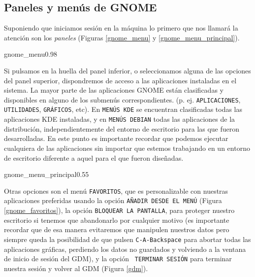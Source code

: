 \subsection{Paneles y menús de GNOME}

Suponiendo  que iniciamos  sesión en  la  máquina lo  primero que  nos
llamará la atención son los  {\em paneles} (Figuras \ref{gnome_menu} y
\ref{gnome_menu_principal}).  

\begin{figura}{gnome_menu}{0.98}
\caption{Menú de panel de {\sf GNOME}}\label{gnome_menu}
\end{figura}

Si  pulsamos  en  la  huella   del  panel  inferior,  o  seleccionamos
alguna  de las  opciones del  panel superior,  dispondremos de  acceso
a  las  aplicaciones instaladas  en  el  sistema.  La mayor  parte  de
las  aplicaciones  {\sf GNOME}  están  clasificadas  y disponibles  en
alguno de  los submenús correspondientes. (p.  ej. {\tt APLICACIONES},
{\tt  UTILIDADES},  {\tt  GRÁFICOS},  etc).  En  {\tt  MENÚS  KDE}  se
encuentran clasificadas todas las aplicaciones {\sf KDE} instaladas, y
en  {\tt MENÚS  DEBIAN}  todas las  aplicaciones  de la  distribución,
independientemente  del  entorno de  escritorio  para  las que  fueron
desarrolladas.  En  este  punto  es importante  recordar  que  podemos
ejecutar  cualquiera  de las  aplicaciones  sin  importar que  estemos
trabajando en un  entorno de escritorio diferente a aquel  para el que
fueron diseñadas.

\begin{figura}{gnome_menu_principal}{0.55}
\caption{Panel alineado de {\sf GNOME} y menú principal}
\label{gnome_menu_principal}
\end{figura}

Otras opciones son el menú  {\tt FAVORITOS}, que es personalizable con
nuestras aplicaciones preferidas usando la opción {\tt AÑADIR DESDE EL
MENÚ}  (Figura  \ref{gnome_favoritos}),  la opción  {\tt  BLOQUEAR  LA
PANTALLA}, para proteger nuestro escritorio si tenemos que abandonarlo
por  cualquier  motivo  (es  importante recordar  que  de  esa  manera
evitaremos  que  manipulen  nuestros   datos  pero  siempre  queda  la
posibilidad de que  pulsen {\tt C-A-Backspace} para  abortar todas las
aplicaciones gráficas, perdiendo los datos  no guardados y volviendo a
la  ventana de  inicio de  sesión  del {\sf  GDM}), y  la opción  {\tt
TERMINAR SESIÓN}  para terminar nuestra  sesión y volver al  {\sf GDM}
(Figura \ref{gdm}).

